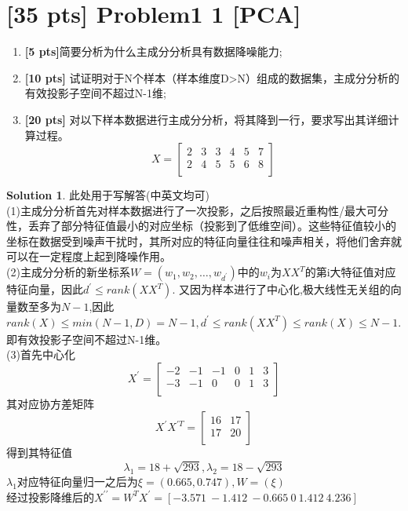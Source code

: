 \documentclass[a4paper,UTF8]{article}
\theoremstyle{definition}
\newtheorem*{solution}{Solution}
\begin{document}
\newpage

\section*{\textbf{[35 pts]} Problem1 1 [PCA]}

\begin{enumerate}[(1)]\item \textbf{[5 pts]}简要分析为什么主成分分析具有数据降噪能力;
	\item \textbf{[10 pts]} 试证明对于N个样本（样本维度D>N）组成的数据集，主成分分析的有效投影子空间不超过N-1维;
	\item \textbf{[20 pts]} 对以下样本数据进行主成分分析，将其降到一行，要求写出其详细计算过程。
\begin{equation}
	X=
 \left[
 \begin{array}{cccccc}
     2 & 3 & 3 &4 &5 &7 \\
    2 &4 &5 &5 &6 &8 \\
 \end{array}
 \right]        
 \end{equation}
	
	
\end{enumerate}

\begin{solution}
此处用于写解答(中英文均可)\\
(1)主成分分析首先对样本数据进行了一次投影，之后按照最近重构性/最大可分性，丢弃了部分特征值最小的对应坐标（投影到了低维空间）。这些特征值较小的坐标在数据受到噪声干扰时，其所对应的特征向量往往和噪声相关，将他们舍弃就可以在一定程度上起到降噪作用。\\
(2)主成分分析的新坐标系$W=(w_1,w_2,\dots,w_{d^\prime})$中的$w_i$为$XX^T$的第i大特征值对应特征向量，因此$d^\prime\le rank(XX^T)$. 又因为样本进行了中心化,极大线性无关组的向量数至多为$N-1$,因此$rank(X)\le min(N-1,D)=N-1,d^\prime \le rank(XX^T)\le rank(X)\le N-1$.即有效投影子空间不超过N-1维。\\
(3)首先中心化\\
\begin{equation*}
X^\prime= \left[
\begin{array}{cccccc}
     -2 & -1 & -1 &0 &1 &3 \\
    -3 &-1 &0 &0 &1 &3 \\
\end{array}
\right]        
\end{equation*}
其对应协方差矩阵
\begin{equation*}
	X^\prime X^{\prime T}= \left[
	\begin{array}{cccccc}
		 16 & 17\\
		 17 & 20 \\
	\end{array}
	\right]        
\end{equation*}
得到其特征值\\
\begin{equation*}
	\lambda_1=18+\sqrt{293},\lambda_2=18-\sqrt{293}
\end{equation*}
$\lambda_1$对应特征向量归一之后为$\xi=(0.665,0.747),W=(\xi)$\\
经过投影降维后的$X^{\prime\prime}=W^TX^\prime=[-3.571\ -1.412\ -0.665\ 0\ 1.412\ 4.236]$
\end{solution}
\end{document}
